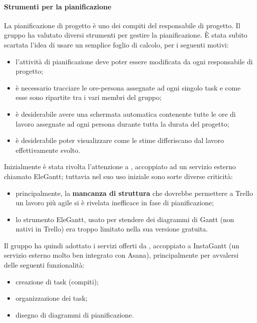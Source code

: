 \paragraph{Strumenti per la pianificazione}
La pianificazione di progetto è uno dei compiti del responsabile di progetto. Il gruppo ha valutato diversi strumenti per gestire la pianificazione. È stata subito scartata l'idea di usare un semplice foglio di calcolo, per i seguenti motivi:
\begin{itemize}
	\item l'attività di pianificazione deve poter essere modificata da ogni responsabile di progetto;
	\item è necessario tracciare le ore-persona assegnate ad ogni singolo task e come esse sono ripartite tra i vari membri del gruppo;
	\item è desiderabile avere una schermata automatica contenente tutte le ore di lavoro assegnate ad ogni persona durante tutta la durata del progetto;
	\item è desiderabile poter visualizzare come le stime differiscano dal lavoro effettivamente svolto.
\end{itemize}
Inizialmente è stata rivolta l'attenzione a , accoppiato ad un servizio esterno chiamato EleGantt; tuttavia nel suo uso iniziale sono sorte diverse criticità:
\begin{itemize}
	\item principalmente, la \textbf{mancanza di struttura} che dovrebbe permettere a Trello un lavoro più agile si è rivelata inefficace in fase di pianificazione;
	\item lo strumento EleGantt, usato per stendere dei diagrammi di Gantt (non nativi in Trello) era troppo limitato nella sua versione gratuita.
\end{itemize}
Il gruppo ha quindi adottato i servizi offerti da , accoppiato a InstaGantt (un servizio esterno molto ben integrato con Asana), principalmente per avvalersi delle seguenti funzionalità:
\begin{itemize}
	\item creazione di task (compiti);
	\item organizzazione dei task;
	\item disegno di diagrammi di pianificazione.
\end{itemize}

